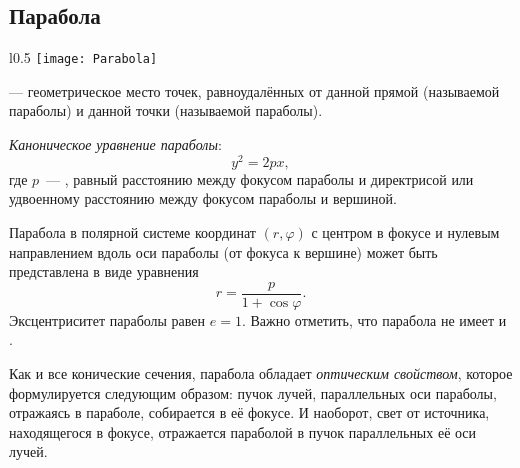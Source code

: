 \subsection{Парабола}
\begin{wrapfigure}[11]{l}{0.5\tw}
	\centering
	\vspace{-.7pc}
	\texttt{[image: Parabola]}
\end{wrapfigure}
{\bfseries {}} --- геометрическое место точек, равноудалённых от данной прямой (называемой  параболы) и данной точки (называемой  параболы).

{\itshape Каноническое уравнение параболы}:
\begin{equation}
	y^2=2px,
\end{equation}
где $p$~--- , равный расстоянию между фокусом параболы и директрисой или удвоенному расстоянию между фокусом параболы и вершиной.

Парабола в полярной системе координат $(r,\varphi)$ с центром в фокусе и нулевым направлением вдоль оси параболы (от фокуса к вершине) может быть представлена в виде уравнения
\begin{equation}
	r = \frac{p}{1 + \cos\varphi}.
\end{equation}
Эксцентриситет параболы равен $e=1$. Важно отметить, что парабола не имеет  и .

Как и все конические сечения, парабола обладает \textit{оптическим свойством}, которое формулируется следующим образом: пучок лучей, параллельных оси параболы, отражаясь в параболе, собирается в её фокусе. И наоборот, свет от источника, находящегося в фокусе, отражается параболой в пучок параллельных её оси лучей.
